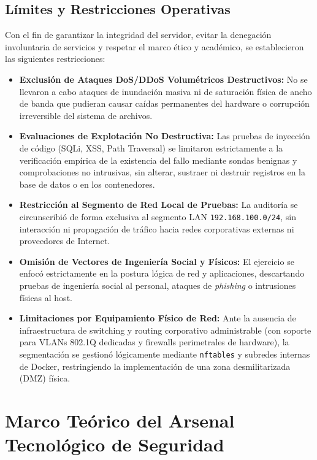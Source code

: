 \subsection{Límites y Restricciones Operativas}

Con el fin de garantizar la integridad del servidor, evitar la denegación involuntaria de servicios y respetar el marco ético y académico, se establecieron las siguientes restricciones:

\begin{itemize}
  \item \textbf{Exclusión de Ataques DoS/DDoS Volumétricos Destructivos:} No se llevaron a cabo ataques de inundación masiva ni de saturación física de ancho de banda que pudieran causar caídas permanentes del hardware o corrupción irreversible del sistema de archivos.
  \item \textbf{Evaluaciones de Explotación No Destructiva:} Las pruebas de inyección de código (SQLi, XSS, Path Traversal) se limitaron estrictamente a la verificación empírica de la existencia del fallo mediante sondas benignas y comprobaciones no intrusivas, sin alterar, sustraer ni destruir registros en la base de datos o en los contenedores.
  \item \textbf{Restricción al Segmento de Red Local de Pruebas:} La auditoría se circunscribió de forma exclusiva al segmento LAN \texttt{192.168.100.0/24}, sin interacción ni propagación de tráfico hacia redes corporativas externas ni proveedores de Internet.
  \item \textbf{Omisión de Vectores de Ingeniería Social y Físicos:} El ejercicio se enfocó estrictamente en la postura lógica de red y aplicaciones, descartando pruebas de ingeniería social al personal, ataques de \textit{phishing} o intrusiones físicas al host.
  \item \textbf{Limitaciones por Equipamiento Físico de Red:} Ante la ausencia de infraestructura de switching y routing corporativo administrable (con soporte para VLANs 802.1Q dedicadas y firewalls perimetrales de hardware), la segmentación se gestionó lógicamente mediante \texttt{nftables} y subredes internas de Docker, restringiendo la implementación de una zona desmilitarizada (DMZ) física.
\end{itemize}

\section{Marco Teórico del Arsenal Tecnológico de Seguridad}


